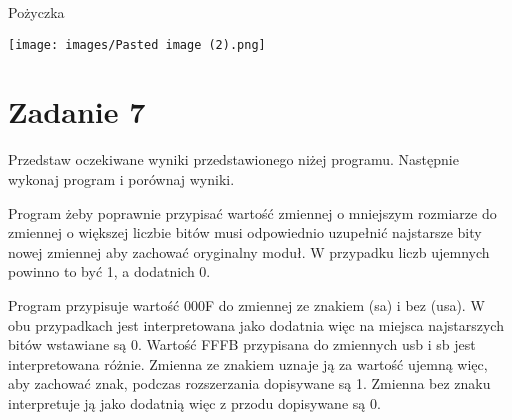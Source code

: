 \documentclass[a4paper, 11pt]{article}
\begin{document}
\begin{center}
	\Large Pożyczka\\
\end{center}

\vspace{0.5cm}

\begin{center}
	\texttt{[image: images/Pasted image (2).png]}
\end{center}


\section{Zadanie 7}\label{sec:zadanie7_} %
Przedstaw oczekiwane wyniki przedstawionego niżej programu. Następnie wykonaj program i porównaj wyniki.

Program żeby poprawnie przypisać wartość zmiennej o mniejszym rozmiarze do zmiennej o większej liczbie bitów musi odpowiednio uzupełnić najstarsze bity nowej zmiennej aby zachować oryginalny moduł. W przypadku liczb ujemnych powinno to być 1, a dodatnich 0.

Program przypisuje wartość 000F do zmiennej ze znakiem (sa) i bez (usa).
W obu przypadkach jest interpretowana jako dodatnia więc na miejsca najstarszych bitów wstawiane są 0.
Wartość FFFB przypisana do zmiennych usb i sb jest interpretowana różnie.
Zmienna ze znakiem uznaje ją za wartość ujemną więc, aby zachować znak, podczas rozszerzania dopisywane są 1. Zmienna bez znaku interpretuje ją jako dodatnią więc z przodu dopisywane są 0.
\end{document}
